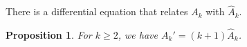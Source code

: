 \documentclass{article}
\newtheorem{proposition}[theorem]{Proposition}%
\begin{document}

There is a differential equation that relates $A_{k}$ with $\widehat{A}_{k}$. 
\medskip
\begin{proposition}\label{prop2.0.1}
  For $k\geq 2$, we have $A_{k}' = (k+1)\widehat{A}_{k}$.
\end{proposition}
\end{document}
